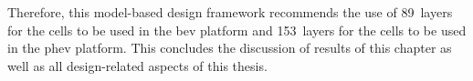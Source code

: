Therefore, this model-based design framework recommends the use of 89~layers for
the cells to be  used in the \gls{bev} platform and 153~layers  for the cells to
be used in the \gls{phev} platform.  This concludes the discussion of results of
this chapter as well as all design-related aspects of this thesis.

